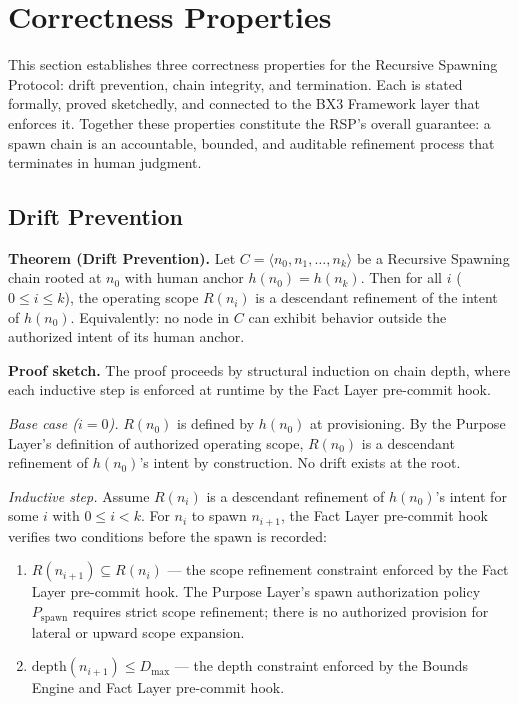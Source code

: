 \section{Correctness Properties}
\label{sec:rs-correctness}

This section establishes three correctness properties for the Recursive Spawning Protocol: drift prevention, chain integrity, and termination. Each is stated formally, proved sketchedly, and connected to the BX3 Framework layer that enforces it. Together these properties constitute the RSP's overall guarantee: a spawn chain is an accountable, bounded, and auditable refinement process that terminates in human judgment.

\subsection{Drift Prevention}
\label{sec:rs-drift-prevention}

\medskip
\noindent\textbf{Theorem (Drift Prevention).} Let $C = \langle n_0, n_1, \ldots, n_k \rangle$ be a Recursive Spawning chain rooted at $n_0$ with human anchor $h(n_0) = h(n_k)$. Then for all $i$ ($0 \leq i \leq k$), the operating scope $R(n_i)$ is a descendant refinement of the intent of $h(n_0)$. Equivalently: no node in $C$ can exhibit behavior outside the authorized intent of its human anchor.

\medskip
\noindent\textbf{Proof sketch.} The proof proceeds by structural induction on chain depth, where each inductive step is enforced at runtime by the Fact Layer pre-commit hook.

\medskip
\textit{Base case ($i=0$).} $R(n_0)$ is defined by $h(n_0)$ at provisioning. By the Purpose Layer's definition of authorized operating scope, $R(n_0)$ is a descendant refinement of $h(n_0)$'s intent by construction. No drift exists at the root.

\medskip
\textit{Inductive step.} Assume $R(n_i)$ is a descendant refinement of $h(n_0)$'s intent for some $i$ with $0 \leq i < k$. For $n_i$ to spawn $n_{i+1}$, the Fact Layer pre-commit hook verifies two conditions before the spawn is recorded:

\begin{enumerate}
    \item[(a)] $R(n_{i+1}) \subseteq R(n_i)$ — the scope refinement constraint enforced by the Fact Layer pre-commit hook. The Purpose Layer's spawn authorization policy $P_{\mathrm{spawn}}$ requires strict scope refinement; there is no authorized provision for lateral or upward scope expansion.
    \item[(b)] $\mathrm{depth}(n_{i+1}) \leq D_{\mathrm{max}}$ — the depth constraint enforced by the Bounds Engine and Fact Layer pre-commit hook.
\end{enumerate}

